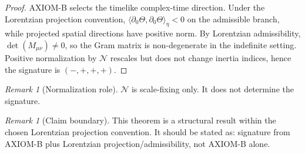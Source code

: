 \documentclass[12pt]{article}
\theoremstyle{definition}
\theoremstyle{remark}
\newtheorem{remark}[theorem]{Remark}
\begin{document}
\begin{proof}
AXIOM-B selects the timelike complex-time direction. Under the Lorentzian projection convention,
$\langle \partial_0\Theta,\partial_0\Theta\rangle_\eta<0$ on the admissible branch, while projected spatial directions have positive norm.
By Lorentzian admissibility, $\det(M_{\mu\nu})\neq0$, so the Gram matrix is non-degenerate in the indefinite setting.
Positive normalization by $\mathcal N$ rescales but does not change inertia indices, hence the signature is $(-,+,+,+)$.
\end{proof}

\begin{remark}[Normalization role]
$\mathcal N$ is scale-fixing only. It does not determine the signature.
\end{remark}

\begin{remark}[Claim boundary]
This theorem is a structural result within the chosen Lorentzian projection convention.
It should be stated as: signature from AXIOM-B plus Lorentzian projection/admissibility,
not AXIOM-B alone.
\end{remark}

\ifdefined\INCLUDEMODE
\else
  
\end{document}
